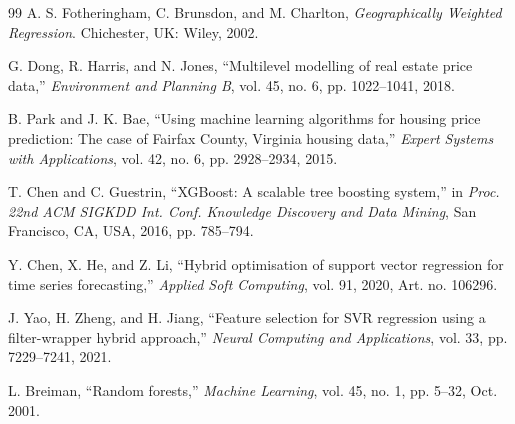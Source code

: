 \documentclass[pdflatex,sn-mathphys-num]{sn-jnl}
\begin{document}
\begin{thebibliography}{99}
A. S. Fotheringham, C. Brunsdon, and M. Charlton,
\textit{Geographically Weighted Regression}.
Chichester, UK: Wiley, 2002.

G. Dong, R. Harris, and N. Jones,
``Multilevel modelling of real estate price data,''
\textit{Environment and Planning B}, vol. 45, no. 6, pp. 1022--1041, 2018.

B. Park and J. K. Bae,
``Using machine learning algorithms for housing price prediction: The case of Fairfax County, Virginia housing data,''
\textit{Expert Systems with Applications}, vol. 42, no. 6, pp. 2928--2934, 2015.

T. Chen and C. Guestrin,
``XGBoost: A scalable tree boosting system,''
in \textit{Proc. 22nd ACM SIGKDD Int. Conf. Knowledge Discovery and Data Mining},
San Francisco, CA, USA, 2016, pp. 785--794.

Y. Chen, X. He, and Z. Li,
``Hybrid optimisation of support vector regression for time series forecasting,''
\textit{Applied Soft Computing}, vol. 91, 2020, Art. no. 106296.

J. Yao, H. Zheng, and H. Jiang,
``Feature selection for SVR regression using a filter-wrapper hybrid approach,''
\textit{Neural Computing and Applications}, vol. 33, pp. 7229--7241, 2021.

L. Breiman,
``Random forests,''
\textit{Machine Learning}, vol. 45, no. 1, pp. 5--32, Oct. 2001.

\end{thebibliography}
\end{document}
